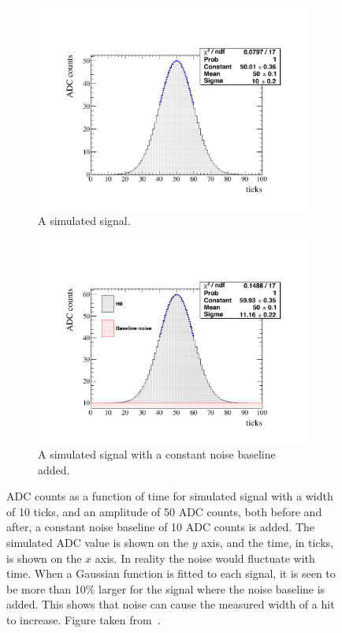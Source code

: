 \begin{figure}
  \centering
  \begin{subfigure}{0.48\textwidth}
    \centering
    \includegraphics[width=\textwidth]{ToyGauss_Raw}
    \caption{A simulated signal.}
  \end{subfigure}%
  \hspace{0.03\textwidth}%
  \begin{subfigure}{0.48\textwidth}
    \centering
    \includegraphics[width=\textwidth]{ToyGauss_Noise}
    \caption{A simulated signal with a constant noise baseline added.}
  \end{subfigure}
  \caption[The effect of adding a noise baseline to a hit]
          {ADC counts as a function of time for  simulated signal with a width of 10 ticks, and an amplitude of 50 ADC counts, both before and after, a constant noise baseline of 10 ADC counts is added. The simulated ADC value is shown on the $y$ axis, and the time, in ticks, is shown on the $x$ axis. In reality the noise would fluctuate with time. When a Gaussian function is fitted to each signal, it is seen to be more than 10\% larger for the signal where the noise baseline is added. This shows that noise can cause the measured width of a hit to increase. Figure taken from~\citep{DomSeptMeeting}.}
          \label{fig:DomsHitModel}
\end{figure}  

